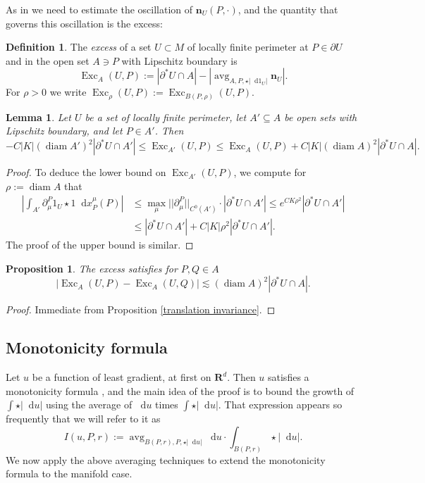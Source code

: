 \documentclass[reqno,11pt]{amsart}
\newcommand{\RR}{\mathbf{R}}
\DeclareMathOperator{\avg}{avg}
\DeclareMathOperator{\diam}{diam}
\DeclareMathOperator{\Exc}{Exc}
\newcommand*\dif{\mathop{}\!\mathrm{d}}
\newcommand{\normal}{\mathbf n}
\newcommand{\dfn}[1]{\emph{#1}\index{#1}}
\newtheorem{lemma}[theorem]{Lemma}
\newtheorem{proposition}[theorem]{Proposition}
\theoremstyle{definition}
\newtheorem{definition}[theorem]{Definition}
\numberwithin{equation}{section}
\begin{document}
As in \cite[Chapters 8-9]{Giusti77} we need to estimate the oscillation of $\normal_U(P, \cdot)$, and the quantity that governs this oscillation is the excess:

\begin{definition}
The \dfn{excess} of a set $U \subset M$ of locally finite perimeter at $P \in \partial U$ and in the open set $A \ni P$ with Lipschitz boundary is
$$\Exc_A(U, P) := |\partial^* U \cap A| - \left|\avg_{A, P, \star |\dif 1_U|} \normal_U\right|.$$
For $\rho > 0$ we write $\Exc_\rho(U, P) := \Exc_{B(P, \rho)}(U, P)$.
\end{definition}

\begin{lemma}
Let $U$ be a set of locally finite perimeter, let $A' \subseteq A$ be open sets with Lipschitz boundary, and let $P \in A'$. Then
\begin{equation}\label{approximate monotone}
-C |K| (\diam A')^2 |\partial^* U \cap A'| \leq \Exc_{A'}(U, P) \leq \Exc_A(U, P) + C |K|(\diam A)^2 |\partial^* U \cap A|.
\end{equation}
\end{lemma}
\begin{proof}
To deduce the lower bound on $\Exc_{A'}(U, P)$, we compute for $\rho := \diam A$ that
\begin{align*}
    \left|\int_{A'} \partial^P_\mu 1_U \star 1 \dif x_P^\mu(P)\right|
 & \leq \max_\mu ||\partial^P_\mu||_{C^0(A')} \cdot |\partial^* U \cap A'| \leq e^{CK\rho^2} |\partial^* U \cap A'| \\
 & \leq |\partial^* U \cap A'| + C|K|\rho^2 |\partial^* U \cap A'|.
\end{align*}
The proof of the upper bound is similar.
\end{proof}

\begin{proposition}\label{translation invariance excess}
The excess satisfies for $P, Q \in A$
$$|\Exc_A(U, P) - \Exc_A(U, Q)| \lesssim (\diam A)^2 |\partial^* U \cap A|.$$
\end{proposition}
\begin{proof}
Immediate from Proposition \ref{translation invariance}.
\end{proof}


\subsection{Monotonicity formula}\label{MollifierSection}
Let $u$ be a function of least gradient, at first on $\RR^d$.
Then $u$ satisfies a monotonicity formula \cite[Theorem 5.12]{Giusti77}, and the main idea of the proof is to bound the growth of $\int \star |\dif u|$ using the average of $\dif u$ times $\int \star |\dif u|$.
That expression appears so frequently that we will refer to it as
\begin{equation}\label{integral of du}
I(u, P, r) := \avg_{B(P, r), P, \star |\dif u|} \dif u \cdot \int_{B(P, r)} \star |\dif u|.
\end{equation}
We now apply the above averaging techniques to extend the monotonicity formula to the manifold case.
\end{document}
